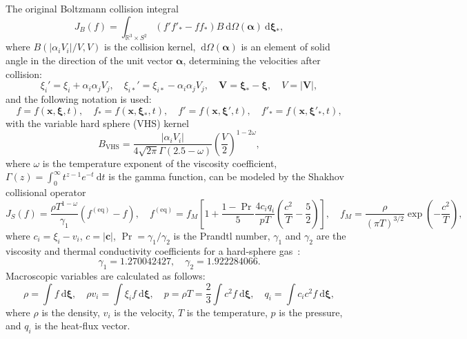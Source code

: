 \documentclass{aip-cp}
\newcommand{\dd}{\:\mathrm{d}}
\newcommand{\dxi}{\dd\boldsymbol{\xi}}
\newcommand{\bxi}{\boldsymbol{\xi}}
\newcommand{\bx}{\boldsymbol{x}}
\begin{document}
The original Boltzmann collision integral
\begin{equation}\label{eq:ci}
    J_B(f) = \int_{\mathbb{R}^3\times S^2} (f'f'_* - ff_*) B \dd \Omega(\boldsymbol{\alpha}) \dxi_*,
\end{equation}
where \(B(|\alpha_i V_i|/V,V)\) is the collision kernel, \(\dd \Omega(\boldsymbol{\alpha})\) is an element of solid angle
in the direction of the unit vector \(\boldsymbol{\alpha}\), determining the velocities after collision:
\begin{equation}\label{eq:after_collision}
    \xi_i' = \xi_i + \alpha_i\alpha_j V_j, \quad \xi_{i*}' = \xi_{i*} - \alpha_i\alpha_j V_j, \quad
    \boldsymbol{V} = \bxi_*-\bxi, \quad V = |\boldsymbol{V}|,
\end{equation}
and the following notation is used:
\begin{equation}\label{eq:Boltzmann_notation}
    f = f(\bx,\bxi,t), \quad f_* = f(\bx,\bxi_*,t), \quad
    f' = f(\bx,\bxi',t), \quad f'_* = f(\bx,\bxi'_*,t),
\end{equation}
with the variable hard sphere (VHS) kernel~\cite{Bird1981vhs}
\begin{equation}\label{eq:ci_kernel_vhs}
    B_\mathrm{VHS} = \frac{|\alpha_i V_i|}{4\sqrt{2\pi}\Gamma(2.5-\omega)}\left(\frac{V}2\right)^{1-2\omega},
\end{equation}
where \(\omega\) is the temperature exponent of the viscosity coefficient,
\(\Gamma(z) = \int_0^\infty t^{z-1}e^{-t}\dd{t}\) is the gamma function,
can be modeled by the Shakhov collisional operator
\begin{equation}\label{eq:shakhov}
    J_S(f) = \frac{\rho T^{1-\omega}}{\gamma_1}\left(f^{\mathrm{(eq)}} - f\right), \quad
    f^{\mathrm{(eq)}} = f_M\left[ 1 + \frac{1-\Pr}5\frac{4c_i q_i}{pT}\left(\frac{c^2}{T}-\frac52\right) \right], \quad
    f_M = \frac{\rho}{(\pi T)^{3/2}}\exp\left(-\frac{c^2}{T}\right),
\end{equation}
where \(c_i = \xi_i - v_i\), \(c = |\boldsymbol{c}|\), \(\Pr=\gamma_1/\gamma_2\) is the Prandtl number,
\(\gamma_1\) and \(\gamma_2\) are the viscosity and thermal conductivity coefficients for a hard-sphere gas~\cite{Sone2007}:
\begin{equation}\label{eq:gammas}
    \gamma_1 = 1.270042427, \quad \gamma_2 = 1.922284066.
\end{equation}
Macroscopic variables are calculated as follows:
\begin{equation}\label{eq:macro}
    \rho = \int f \dxi, \quad
    \rho v_i = \int \xi_i f \dxi, \quad
    p = \rho T = \frac23\int c^2 f \dxi, \quad
    q_i = \int c_i c^2 f \dxi,
\end{equation}
where \(\rho\) is the density, \(v_i\) is the velocity, \(T\) is the temperature, \(p\) is the pressure,
and \(q_i\) is the heat-flux vector.
\end{document}
